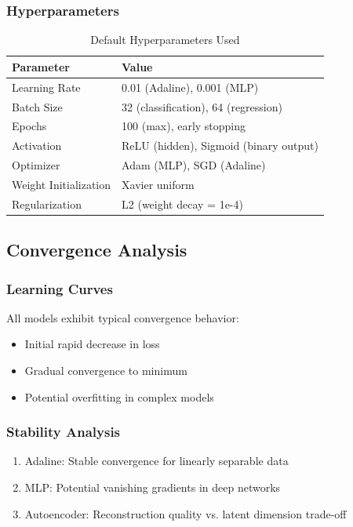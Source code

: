 \documentclass[conference]{IEEEtran}
\begin{document}
\subsubsection{Hyperparameters}
\begin{table}[h]
\centering
\caption{Default Hyperparameters Used}
\begin{tabular}{l l}
\toprule
Parameter & Value \\
\midrule
Learning Rate & 0.01 (Adaline), 0.001 (MLP) \\
Batch Size & 32 (classification), 64 (regression) \\
Epochs & 100 (max), early stopping \\
Activation & ReLU (hidden), Sigmoid (binary output) \\
Optimizer & Adam (MLP), SGD (Adaline) \\
Weight Initialization & Xavier uniform \\
Regularization & L2 (weight decay = 1e-4) \\
\bottomrule
\end{tabular}
\label{tab:hyperparameters}
\end{table}

\subsection{Convergence Analysis}
\subsubsection{Learning Curves}
All models exhibit typical convergence behavior:
\begin{itemize}
    \item Initial rapid decrease in loss
    \item Gradual convergence to minimum
    \item Potential overfitting in complex models
\end{itemize}

\subsubsection{Stability Analysis}
\begin{enumerate}
    \item Adaline: Stable convergence for linearly separable data
    \item MLP: Potential vanishing gradients in deep networks
    \item Autoencoder: Reconstruction quality vs. latent dimension trade-off
\end{enumerate}
\end{document}
